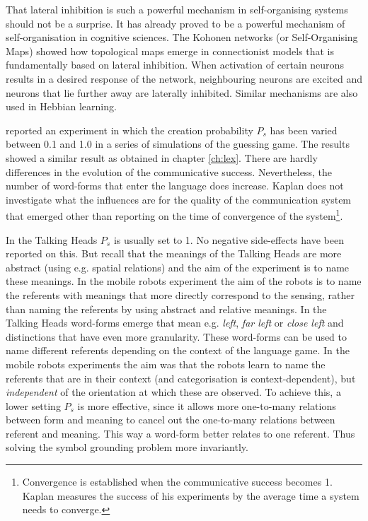 That lateral inhibition is such a powerful mechanism in self-organising systems should not be a surprise. It has already proved to be a powerful mechanism of self-organisation in cognitive sciences. The Kohonen networks (or Self-Organising Maps) showed how topological maps emerge in connectionist models that is fundamentally based on lateral inhibition. When activation of certain neurons results in a desired response of the network, neighbouring neurons are excited and neurons that lie further away are laterally inhibited. Similar mechanisms are also used in Hebbian learning.


\citet{kaplan:2000} reported an experiment in which the creation probability $P_s$ has been varied between 0.1 and 1.0 in a series of simulations of the guessing game. The results showed a similar result as obtained in chapter \ref{ch:lex}. There are hardly differences in the evolution of the communicative success. Nevertheless, the number of word-forms that enter the language does increase. Kaplan does not investigate what the influences are for the quality of the communication system that emerged other than reporting on the time of convergence of the system\footnote{Convergence is established when the communicative success becomes 1. Kaplan measures the success of his experiments by the average time a system needs to converge.}. 

In the Talking Heads $P_s$ is usually set to 1. No negative side-effects have been reported on this. But recall that the meanings of the Talking Heads are more abstract (using e.g. spatial relations) and the aim of the experiment is to name these meanings. In the mobile robots experiment the aim of the robots is to name the referents with meanings that more directly correspond to the sensing, rather than naming the referents by using abstract and relative meanings. In the Talking Heads word-forms emerge that mean e.g. {\em left}, {\em far left} or {\em close left} and distinctions that have even more granularity. These word-forms can be used to name different referents depending on the context of the language game. In the mobile robots experiments the aim was that the robots learn to name the referents that are in their context (and categorisation is context-dependent), but {\em independent} of the orientation at which these are observed. To achieve this, a lower setting $P_s$ is more effective, since it allows more one-to-many relations between form and meaning to cancel out the one-to-many relations between referent and meaning. This way a word-form better relates to one referent. Thus solving the symbol grounding problem more invariantly.


